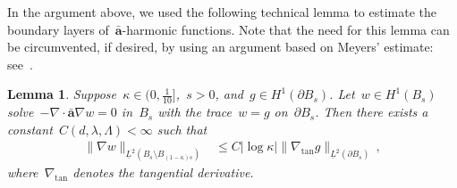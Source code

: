 \documentclass[11pt,twoside]{article} %
\numberwithin{equation}{section}
\newtheorem{lemma}[theorem]{Lemma}
\theoremstyle{definition}
\renewcommand{\a}{\mathbf{a}}
\newcommand{\ahom}{\bar{\a}}
\begin{document}
In the argument above, we used the following technical lemma to estimate the boundary layers of~$\ahom$-harmonic functions. Note that the need for this lemma can be circumvented, if desired, by using an argument based on Meyers' estimate: see~\cite{AKMBook}. 

\begin{lemma} \label{l.bndrlayer}
Suppose~$\kappa \in (0,\frac1{10}]$,~$s >0$, and~$g \in H^{1}(\partial B_{s})$. Let~$w \in H^1(B_s)$ solve~$-\nabla \cdot \ahom \nabla w = 0$ in~$B_s$ with the trace~$w = g$ on~$\partial B_s$. Then there exists a constant~$C(d,\lambda,\Lambda) < \infty$ such that 
\begin{align}  \label{e.homog.bndrlayer}
\| \nabla w \|_{\underline{L}^2(B_{s} \setminus B_{(1-\kappa)s})} 
& \leq 
C |\log \kappa|   \| \nabla_{\mathrm{tan}} g \|_{\underline{L}^2(\partial B_{s})}  
\,,
\end{align}
where~$\nabla_{\mathrm{tan}}$ denotes the tangential derivative. 
\end{lemma}
\end{document}
